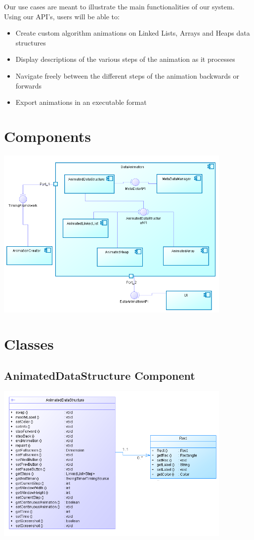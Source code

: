 \documentclass{l3proj}
\begin{document}
Our use cases are meant to illustrate the main functionalities of our system. Using our API's, users will
be able to:
\begin{itemize}
\item Create custom algorithm animations on Linked Lists, Arrays and Heaps data structures
\item Display descriptions of the various steps of the animation as it processes
\item Navigate freely between the different steps of the animation backwards or forwards
\item Export animations in an executable format
\end{itemize}
\section{Components}
\includegraphics[width=115mm]{images/componentDiagram.png}

\section{Classes}
\subsection{AnimatedDataStructure Component}
\includegraphics[width=115mm]{images/animatedDataStructureDiagram.png}
\end{document}
